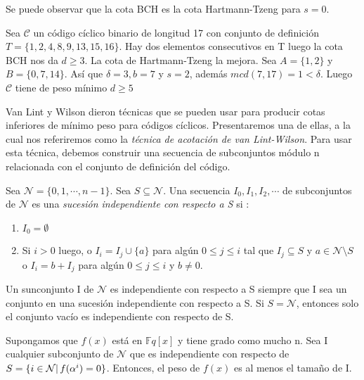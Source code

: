 Se puede observar que la cota BCH es la cota Hartmann-Tzeng para $s=0$.

\begin{exampleth}
\label{ex:cota_Hartmann}
Sea $\mathcal{C}$ un código cíclico binario de longitud 17 con conjunto de definición $T = \{ 1,2,4,8,9,13,15,16 \}$. Hay dos elementos consecutivos en T luego la cota BCH nos da $ d \geq 3 $. La cota de Hartmann-Tzeng la mejora. Sea $A = \{ 1,2 \}$ y $B = \{ 0,7,14 \}$. Así que $\delta = 3, b=7$ y $s=2$, además $mcd(7,17) = 1 < \delta$. Luego $\mathcal{C}$ tiene de peso mínimo $d \geq 5$
\end{exampleth}


Van Lint y Wilson dieron técnicas que se pueden usar para producir cotas inferiores de mínimo peso para códigos cíclicos. Presentaremos una de ellas, a la cual nos referiremos como la \textit{técnica de acotación de van Lint-Wilson}. Para usar esta técnica, debemos construir una secuencia de subconjuntos módulo n relacionada con el conjunto de definición del código.

\begin{definition}
Sea $\mathcal{N} = \{ 0,1, \cdots, n-1 \}$. Sea $ S \subseteq \mathcal{N}$. Una secuencia $I_0,I_1,I_2, \cdots$ de subconjuntos de $\mathcal{N}$ es una \textit{sucesión independiente con respecto a S} si :

\begin{enumerate}
	\item $I_0 = \emptyset $
	\item Si $ i > 0 $ luego, o $I_i = I_j \cup \{ a \}$ para algún $ 0 \leq j \leq i$ tal que $I_j \subseteq S$ y $a \in \mathcal{N}\setminus S$ o $I_i = b + I_j$ para algún $ 0 \leq j \leq i$ y $b \neq 0 $.
\end{enumerate}
\end{definition}

Un sunconjunto I de $\mathcal{N}$ es independiente con respecto a S  siempre que I sea un conjunto en una sucesión independiente con respecto a S. Si $S = \mathcal{N}$, entonces solo el conjunto vacío es independiente con respecto de S.

\begin{theorem}
Supongamos que $f(x)$ está en $\mathbb{F}q[x]$ y tiene grado como mucho n. Sea I cualquier subconjunto de $\mathcal{N}$ que es independiente con respecto de $S = \{ i \in \mathcal{N} | \thinspace f(\alpha^i) = 0 \}$. Entonces, el peso de $f(x)$ es al menos el tamaño de I.
\end{theorem}

